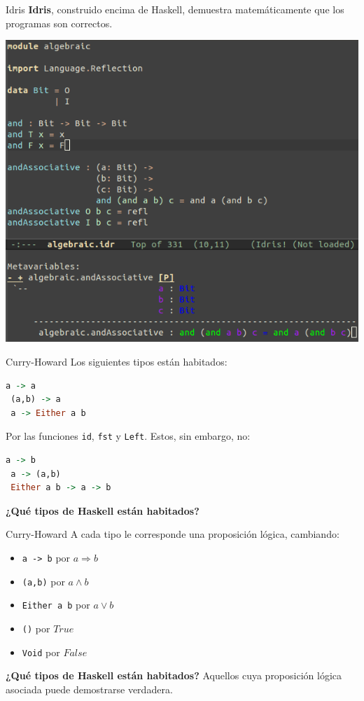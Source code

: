 \begin{frame}[fragile]{Idris}
  \textbf{Idris}, construido encima de Haskell, demuestra
  matemáticamente que los
  programas son correctos.
  
  \begin{center}
  \includegraphics[scale=0.28]{./images/idris.png}
  \end{center}
\end{frame}


\begin{frame}[fragile]{Curry-Howard}
 Los siguientes tipos están habitados:
 \begin{lstlisting}[language=haskell]
 a -> a
 (a,b) -> a
 a -> Either a b
 \end{lstlisting}
 Por las funciones \texttt{id}, \texttt{fst} y \texttt{Left}. 
 Estos, sin embargo, no:
 \begin{lstlisting}[language=haskell]
 a -> b
 a -> (a,b)
 Either a b -> a -> b
 \end{lstlisting}
 
 \textbf{¿Qué tipos de Haskell están habitados?} 
\end{frame}


\begin{frame}[fragile]{Curry-Howard}
 A cada tipo le corresponde una proposición lógica, cambiando:
 \begin{itemize}
  \item \texttt{a -> b} por $a \Rightarrow b$
  \item \texttt{(a,b)} por $a \wedge b$
  \item \texttt{Either a b} por $a \vee b$
  \item \texttt{()} por $True$
  \item \texttt{Void} por $False$
 \end{itemize}

 \espacio
 \textbf{¿Qué tipos de Haskell están habitados?} Aquellos cuya
 proposición lógica asociada puede demostrarse verdadera.
\end{frame}